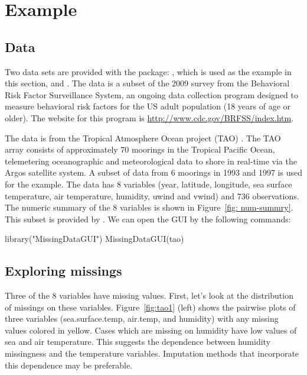 \documentclass[article]{jss}
\begin{document}
\section{Example}\label{Examples}

\subsection{Data}

Two data sets are provided with the package: , which is used as the example in this section, and . The  data is a subset of the 2009 survey from the Behavioral Risk Factor Surveillance System, an ongoing data collection program designed to measure behavioral risk factors for the US adult population (18 years of age or older). The website for this program is \url{http://www.cdc.gov/BRFSS/index.htm}.

The data  is from the Tropical Atmosphere Ocean project (TAO) \citep{tao}. The TAO array consists of approximately 70 moorings in the Tropical Pacific Ocean, telemetering oceanographic and meteorological data to shore in real-time via the Argos satellite system. A subset of data from 6 moorings in 1993 and 1997 is used for the example. The data has 8 variables (year, latitude, longitude, sea surface temperature, air temperature, humidity, uwind and vwind) and 736 observations. The numeric summary of the 8 variables is shown in Figure~\ref{fig: num-summry}. This subset is provided by \citet{CS07}. We can open the GUI by the following commands:

\begin{Code}
library("MissingDataGUI")
MissingDataGUI(tao)
\end{Code}


\subsection{Exploring missings}

Three of the 8 variables have missing values. First, let's look at the distribution of missings on these variables. Figure~\ref{fig:tao1} (left) shows the pairwise plots of three variables (sea.surface.temp, air.temp, and humidity) with any missing values colored in yellow. Cases which are missing on humidity have low values of sea and air temperature. This suggests the dependence between humidity missingness and the temperature variables. Imputation methods that incorporate this dependence may be preferable.
\end{document}
